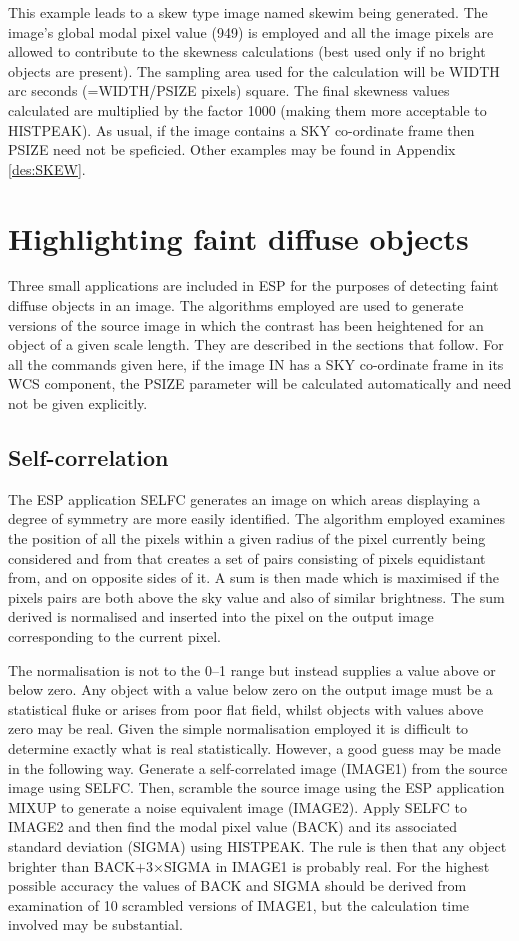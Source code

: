 \documentclass[twoside,11pt]{starlink}
\begin{document}
This example leads to a skew type image named skewim being generated.
The image's global modal pixel value (949) is employed and all the image
pixels are allowed to contribute to the skewness calculations (best used
only if no bright objects are present). The sampling area used for the
calculation will be WIDTH arc seconds (=WIDTH/PSIZE pixels) square.
The final skewness values calculated are multiplied by the factor
1000 (making them more acceptable to HISTPEAK).
As usual, if the image contains a SKY co-ordinate frame then PSIZE
need not be speficied.
Other examples may be
found in Appendix \ref{des:SKEW}.

\section{Highlighting faint diffuse objects}
\label{sec:highlighting}

Three small applications are included in ESP for the purposes of detecting faint
diffuse objects in an image. The algorithms employed are used to generate
versions of the source image in which the contrast has been heightened for
an object of a given scale length. They are described in the sections that
follow.
For all the commands given here, if the image IN has a SKY co-ordinate
frame in its WCS component, the PSIZE parameter will be calculated
automatically and need not be given explicitly.

\subsection{Self-correlation}

The ESP application SELFC generates an image on which areas
displaying a degree of symmetry are more easily identified. The algorithm
employed examines the position of all the pixels within a given radius of
the pixel currently being considered and from that creates a set of pairs
consisting of pixels equidistant from, and on opposite sides of it. A
sum is then made which is maximised if the pixels pairs are both above
the sky value and also of similar brightness. The sum derived is
normalised and inserted into the pixel on the output image corresponding
to the current pixel.

The normalisation is not to the 0--1 range but instead supplies a value above
or below zero. Any object with a value below zero on the output image
must be a statistical fluke or arises from poor flat field, whilst
objects with values above zero may be real. Given the simple normalisation
employed it is difficult to determine exactly what is real statistically.
However, a good guess may be made in the following way. Generate a
self-correlated image (IMAGE1) from the source image using SELFC. Then,
scramble the source image using the ESP application MIXUP to generate
a noise equivalent image (IMAGE2). Apply SELFC to IMAGE2 and then find
the modal pixel value (BACK) and its associated standard deviation (SIGMA) using
HISTPEAK. The rule is then that any object brighter than BACK$+$3$\times$SIGMA
in IMAGE1 is probably real. For the highest possible accuracy the values
of BACK and SIGMA should be derived from examination of 10 scrambled versions
of IMAGE1, but the calculation time involved may be substantial.
\end{document}
